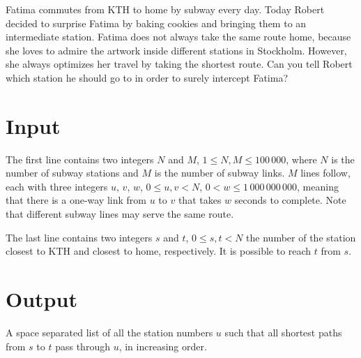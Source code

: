 

\noindent
Fatima commutes from KTH to home by subway every day. Today Robert decided to surprise Fatima by
baking cookies and bringing them to an intermediate station. Fatima does not always take the same
route home, because she loves to admire the artwork inside different stations in Stockholm. However,
she always optimizes her travel by taking the shortest route. Can you tell Robert which station he
should go to in order to surely intercept Fatima?

\section*{Input}
The first line contains two integers $N$ and $M$, $1 \leq N,M \leq 100\,000$, where $N$ is the
number of subway stations and $M$ is the number of subway links. $M$ lines follow, each with three
integers $u$, $v$, $w$, $0 \leq u,v < N$, $0 < w \leq 1\,000\,000\,000$, meaning that there is a
one-way link from $u$ to $v$ that takes $w$ seconds to complete. Note that different subway lines may serve the same route.

The last line contains two integers $s$ and $t$, $0 \leq s,t < N$  the number of the station closest
to KTH and closest to home, respectively. It is possible to reach $t$ from $s$.

\section*{Output}
A space separated list of all the station numbers $u$ such that all shortest paths from $s$ to $t$ pass through $u$, in increasing order.

